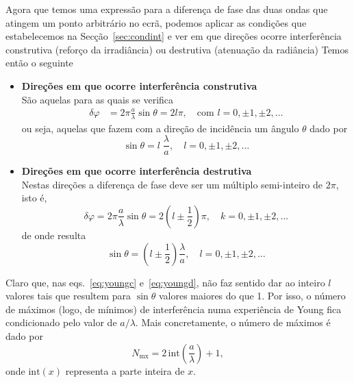Agora que temos uma expressão para a diferença de fase das duas ondas que
atingem um ponto arbitrário no ecrã, podemos aplicar as condições que
estabelecemos na Secção~\ref{sec:condint} e ver em que direções ocorre
interferência construtiva (reforço da irradiância) ou destrutiva (atenuação da
radiância)
Temos então o seguinte
\begin{itemize}
\item
    \textbf{Direções em que ocorre interferência construtiva}\\
    São aquelas para as quais se verifica
    \begin{align*}
    \delta\varphi &= 2\pi\frac{a}{\lambda}\sin\theta=
                    2l\pi,\quad\text{com }l=0,\pm1,\pm2,\ldots
    \end{align*}
    ou seja, aquelas que fazem com a direção de incidência um ângulo $\theta$
    dado por
    \begin{equation}\label{eq:youngc}
      \sin\theta=l\;\frac\lambda a,\quad l=0,\pm1,\pm2,\ldots
    \end{equation}
\item
    \textbf{Direções em que ocorre interferência destrutiva}\\
    Nestas direções a diferença de fase deve ser um múltiplo semi-inteiro de
    $2\pi$, isto é,
    \begin{equation*}
        \delta\varphi=2\pi\frac{a}{\lambda}\sin\theta=2\left(l\pm\frac12\right)
        \pi,\quad k=0,\pm1,\pm2,\ldots
    \end{equation*}
    de onde resulta
    \begin{equation}\label{eq:youngd}
        \sin\theta=\left(l\pm\frac12\right)\frac\lambda a,\quad
        l=0,\pm1,\pm2,\ldots
    \end{equation}
\end{itemize}
Claro que, nas eqs.~\eqref{eq:youngc} e~\eqref{eq:youngd}, não faz sentido dar
ao inteiro $l$ valores tais que resultem para $\sin\theta$ valores maiores
do que 1. Por isso, o número de máximos (logo, de mínimos) de interferência numa
experiência de Young fica condicionado pelo valor de $a/\lambda$. Mais
concretamente, o número de máximos é dado por
\begin{equation*}
  N_\text{mx}=2\,\text{int}(\frac{a}{\lambda}) + 1,
\end{equation*}
onde $\text{int}(x)$ representa a parte inteira de $x$.



